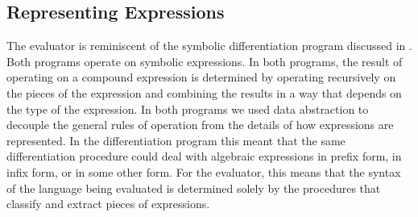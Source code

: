 \subsection{Representing Expressions}
\label{Section 4.1.2}

The evaluator is reminiscent of the symbolic differentiation program discussed in .
Both programs operate on symbolic expressions.
In both programs, the result of operating on a compound expression is determined by operating recursively on the pieces of the expression and combining the results in a way that depends on the type of the expression.
In both programs we used data abstraction to decouple the general rules of operation from the details of how expressions are represented.
In the differentiation program this meant that the same differentiation procedure could deal with algebraic expressions in prefix form, in infix form, or in some other form.
For the evaluator, this means that the syntax of the language being evaluated is determined solely by the procedures that classify and extract pieces of expressions.

